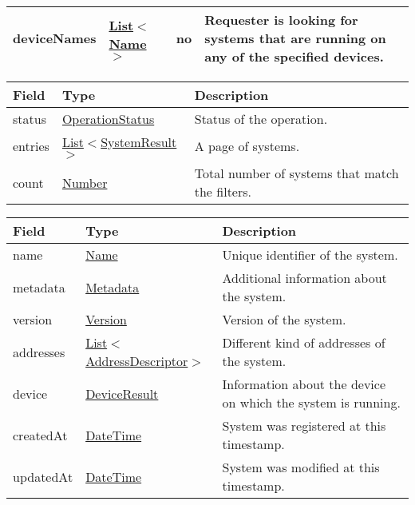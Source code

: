 \documentclass[a4paper]{arrowhead}
\newcommand{\pref}[1]{{\textcolor{ArrowheadGrey}{\hyperref[sec:model:primitives:#1]{#1}}}}
\begin{document}
\begin{table}[ht!]
\begin{tabularx}{\textwidth}{| p{4.1cm} | p{4.8cm} | p{2cm} | X |} \hline
deviceNames &  \pref{List}$<$\pref{Name}$>$ & no & Requester is looking for systems that are running on any of the specified devices. \\ \hline
\end{tabularx}
\end{table}

\label{sec:model:SystemListResponse}

\begin{table}[H]
\begin{tabularx}{\textwidth}{| p{2.5cm} | p{3.2cm} | X |} \hline
\rowcolor{gray!33} Field & Type      & Description \\ \hline
status & \pref{OperationStatus} & Status of the operation. \\ \hline
entries & \pref{List}$<$\hyperref[sec:model:SystemResult]{SystemResult}$>$ & A page of systems. \\ \hline
count & \pref{Number} & Total number of systems that match the filters. \\ \hline
\end{tabularx}
\end{table}

\label{sec:model:SystemResult}
 
\begin{table}[ht!]
\begin{tabularx}{\textwidth}{| p{2.5cm} | p{4cm} | X |} \hline
\rowcolor{gray!33} Field & Type      & Description \\ \hline
name & \pref{Name} & Unique identifier of the system. \\ \hline
metadata & \hyperref[sec:model:Metadata]{Metadata} & Additional information about the system. \\ \hline
version & \pref{Version} & Version of the system. \\ \hline
addresses &  \pref{List}$<$\hyperref[sec:model:AddressDescriptor]{AddressDescriptor}$>$ & Different kind of addresses of the system.  \\ \hline
device & \hyperref[sec:model:DeviceResult]{DeviceResult} & Information about the device on which the system is running. \\ \hline
createdAt & \pref{DateTime} & System was registered at this timestamp. \\ \hline
updatedAt & \pref{DateTime} & System was modified at this timestamp. \\ \hline
\end{tabularx}
\end{table}
\end{document}
